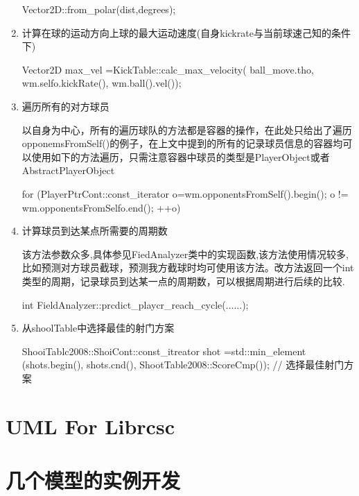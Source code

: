 \begin{enumerate}
\begin{Code}
	Vector2D::from_polar(dist,degrees);
\end{Code}

	\item 计算在球的运动方向上球的最大运动速度(自身kickrate与当前球速己知的条件下) 
	
\begin{Code}
	Vector2D max_vel
		=KickTable::calc_max_velocity( ball_move.tho,
				wm.selfo.kickRate(),
				wm.ball().vel());
\end{Code}


	\item 遍历所有的对方球员

以自身为中心，所有的遍历球队的方法都是容器的操作，在此处只给出了遍历opponemsFromSelf()的例子，在上文中提到的所有的记录球员信息的容器均可以使用如下的方法遍历，只需注意容器中球员的类型是PlayerObject或者AbstractPlayerObject
\begin{Code}
	for (PlayerPtrCont::const_iterator o=wm.opponentsFromSelf().begin();
		o != wm.opponentsFromSelfo.end();
		++o)
\end{Code}


	\item 计算球员到达某点所需要的周期数

该方法参数众多,具体参见FiedAnalyzer类中的实现函数,该方法使用情况较多,比如预测对方球员截球，预测我方截球时均可使用该方法。改方法返回一个int类型的周期，记录球员到达某一点的周期数，可以根据周期进行后续的比较.
\begin{Code}
	int FieldAnalyzer::prcdict_playcr_reach_cycle(......);	
\end{Code}

	\item 从shoolTable中选择最佳的射门方案
\begin{Code}
	ShooiTablc2008::ShoiCont::const_itreator shot
	=std::min_element (shots.begin(),
			shots.cnd(),
			ShootTable2008::ScoreCmp()); // 选择最佳射门方案 
\end{Code}

\end{enumerate}
\section{UML For Librcsc}

\section{几个模型的实例开发}



